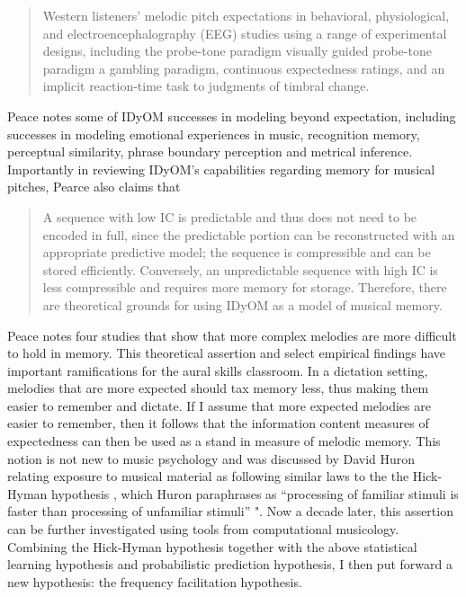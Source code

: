 \documentclass[12pt,]{book}
\begin{document}
\begin{quote}
Western listeners' melodic pitch expectations in behavioral,
physiological, and electroencephalography (EEG) studies using a range of experimental designs, including the probe-tone paradigm visually guided probe-tone paradigm a gambling paradigm, continuous expectedness ratings, and an implicit reaction-time task to judgments of timbral change.
\end{quote}

Peace notes some of IDyOM successes in modeling beyond expectation, including successes in modeling emotional experiences in music, recognition memory, perceptual similarity, phrase boundary perception and metrical inference.
Importantly in reviewing IDyOM's capabilities regarding memory for musical pitches, Pearce also claims that

\begin{quote}
A sequence with low IC is predictable and thus does not need to be encoded in full, since the predictable portion can be reconstructed with an appropriate predictive model; the sequence is compressible and can be stored efficiently. Conversely, an unpredictable sequence with high IC is less compressible and requires more memory for storage. Therefore, there are theoretical grounds for using IDyOM as a model of musical memory.
\end{quote}

Peace notes four studies \citep{bartlettRecognitionTransposedMelodies1980, cohenRecognitionTransposedTone1977, cuddyMusicalPatternRecognition1981, halpernAgingExperienceRecognition1995} that show that more complex melodies are more difficult to hold in memory.
This theoretical assertion and select empirical findings have important ramifications for the aural skills classroom.
In a dictation setting, melodies that are more expected should tax memory less, thus making them easier to remember and dictate.
If I assume that more expected melodies are easier to remember, then it follows that the information content measures of expectedness can then be used as a stand in measure of melodic memory.
This notion is not new to music psychology and was discussed by David Huron relating exposure to musical material as following similar laws to the the Hick-Hyman hypothesis \citep{hickRateGainInformation1952, hymanStimulusInformationDeterminant1953}, which Huron paraphrases as ``processing of familiar stimuli is faster than processing of unfamiliar stimuli'' \citep[pp.~63]{huronSweetAnticipation2006}".
Now a decade later, this assertion can be further investigated using tools from computational musicology.
Combining the Hick-Hyman hypothesis together with the above statistical learning hypothesis and probabilistic prediction hypothesis, I then put forward a new hypothesis: the frequency facilitation hypothesis.
\end{document}
